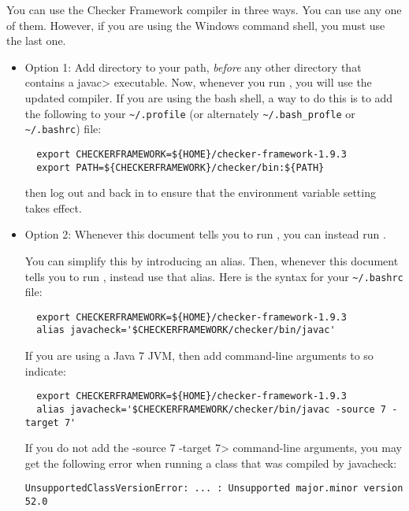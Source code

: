 You can use the Checker Framework compiler in three ways.  You can use any
one of them.  However, if you are using the Windows command shell, you must
use the last one.


\begin{itemize}
  \item
    Option 1:
    Add directory
     to your path, \emph{before} any other
    directory that contains a \<javac> executable.  Now, whenever
    you run , you will use the updated compiler.  If you are
    using the bash shell, a way to do this is to add the following to your
    \verb|~/.profile| (or alternately \verb|~/.bash_profle| or \verb|~/.bashrc|) file:
\begin{Verbatim}
  export CHECKERFRAMEWORK=${HOME}/checker-framework-1.9.3
  export PATH=${CHECKERFRAMEWORK}/checker/bin:${PATH}
\end{Verbatim}
    then log out and back in to ensure that the environment variable
    setting takes effect.
  \item
    Option 2:
    Whenever this document tells you to run , you
    can instead run .

    You can simplify this by introducing an alias.  Then,
    whenever this document tells you to run , instead use that
    alias.  Here is the syntax for your
    \verb|~/.bashrc| file:
\begin{Verbatim}
  export CHECKERFRAMEWORK=${HOME}/checker-framework-1.9.3
  alias javacheck='$CHECKERFRAMEWORK/checker/bin/javac'
\end{Verbatim}

    If you are using a Java 7 JVM, then add command-line arguments to so
    indicate:

\begin{Verbatim}
  export CHECKERFRAMEWORK=${HOME}/checker-framework-1.9.3
  alias javacheck='$CHECKERFRAMEWORK/checker/bin/javac -source 7 -target 7'
\end{Verbatim}

   If you do not add the \<-source 7 -target 7> command-line arguments, you
   may get the following error when running a class that was compiled by
   javacheck:
\begin{Verbatim}
UnsupportedClassVersionError: ... : Unsupported major.minor version 52.0
\end{Verbatim}


\end{itemize}

